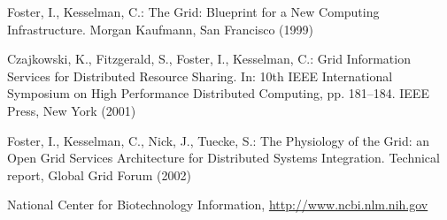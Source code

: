 \documentclass[runningheads,a4paper]{llncs}
\begin{document}
\begin{thebibliography}{4}
 Foster, I., Kesselman, C.: The Grid: Blueprint for a New Computing
Infrastructure. Morgan Kaufmann, San Francisco (1999)

 Czajkowski, K., Fitzgerald, S., Foster, I., Kesselman, C.: Grid
Information Services for Distributed Resource Sharing. In: 10th IEEE
International Symposium on High Performance Distributed Computing, pp.
181--184. IEEE Press, New York (2001)

 Foster, I., Kesselman, C., Nick, J., Tuecke, S.: The Physiology of the
Grid: an Open Grid Services Architecture for Distributed Systems
Integration. Technical report, Global Grid Forum (2002)

 National Center for Biotechnology Information, \url{http://www.ncbi.nlm.nih.gov}


%

\end{thebibliography}
\end{document}
